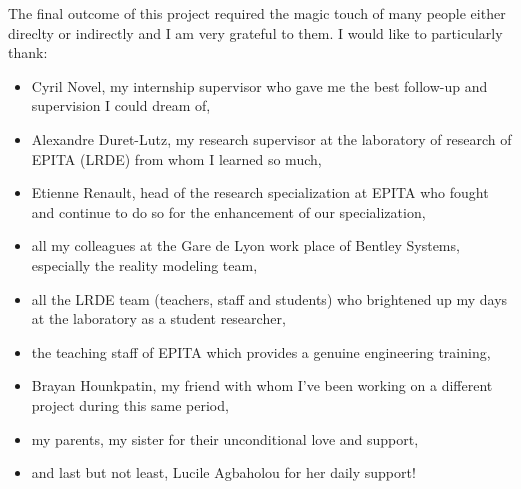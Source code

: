 \cleardoublepage


\begin{acknowledgements}

The final outcome of this project required the magic touch of many people either direclty or indirectly and I am very grateful to them.  I would like to particularly thank:
\begin{itemize}
\item Cyril Novel, my internship supervisor who gave me the best follow-up and supervision I could dream of,
\item Alexandre Duret-Lutz, my research supervisor at the laboratory of research of EPITA (LRDE) from whom I learned so much,
\item Etienne Renault, head of the research specialization at EPITA who fought and continue to do so for the enhancement of our specialization,
\item all my colleagues at the Gare de Lyon work place of Bentley Systems, especially the reality modeling team,
\item all the LRDE team (teachers, staff and students) who brightened up my days at the laboratory as a student researcher,
\item the teaching staff of EPITA which provides a genuine engineering training,
\item Brayan Hounkpatin, my friend with whom I've been working on a different project during this same period,
\item my parents, my sister for their unconditional love and support,
\item and last but not least, Lucile Agbaholou for her daily support!
\end{itemize}
\end{acknowledgements}
